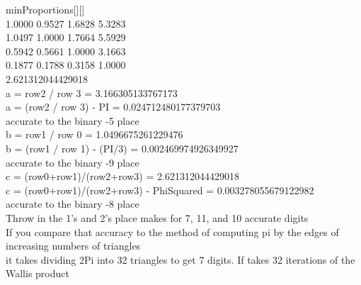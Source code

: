 \documentclass[11pt]{article}
\begin{document}
\noindent minProportions[][]\\
1.0000 0.9527 1.6828 5.3283 \\
1.0497 1.0000 1.7664 5.5929 \\
0.5942 0.5661 1.0000 3.1663 \\
0.1877 0.1788 0.3158 1.0000 \\
2.621312044429018\\

\noindent a = row2 / row 3 = 3.166305133767173\\
a = (row2 / row 3) - PI = 0.024712480177379703\\
accurate to the binary -5 place\\

\noindent b = row1 / row 0 = 1.0496675261229476\\
b = (row1 / row 1) - (PI/3) = 0.002469974926349927\\
accurate to the binary -9 place\\

\noindent c = (row0+row1)/(row2+row3) = 2.621312044429018\\
c = (row0+row1)/(row2+row3) - PhiSquared = 0.003278055679122982\\
accurate to the binary -8 place\\

\noindent Throw in the 1's and 2's place makes for 7, 11, and 10 accurate digits\\
If you compare that accuracy to the method of computing pi by the edges of increasing numbers of triangles\\
it takes dividing 2Pi into 32 triangles to get 7 digits. If takes 32 iterations of the Wallis product\\



\end{document}
